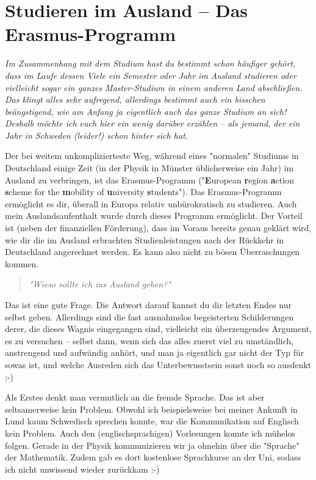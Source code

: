 \section[Studieren im Ausland – Erasmus]{Studieren im Ausland – Das Erasmus-Programm}
\begin{multicols}{2}
\textit{Im Zusammenhang mit dem Studium hast du bestimmt schon häufiger gehört, dass im Laufe dessen Viele ein Semester oder Jahr im Ausland studieren oder vielleicht sogar ein ganzes Master-Studium in einem anderen Land abschließen.
Das klingt alles sehr aufregend, allerdings bestimmt auch ein bisschen beängstigend, wie am Anfang ja eigentlich auch das ganze Studium an sich!
Deshalb möchte ich euch hier ein wenig darüber erzählen – als jemand, der ein Jahr in Schweden (leider!) schon hinter sich hat.}

Der bei weitem unkomplizierteste Weg, während eines "normalen" Studiums in Deutschland einige Zeit (in der Physik in Münster üblicherweise ein Jahr) im Ausland zu verbringen, ist das Erasmus-Programm ("\textbf{E}uropean \textbf{r}egion \textbf{a}ction \textbf{s}cheme for the \textbf{m}obility of \textbf{u}niversity \textbf{s}tudents").
Das Erasmus-Programm ermöglicht es dir, überall in Europa relativ unbürokratisch zu studieren.
Auch mein Auslandsaufenthalt wurde durch dieses Programm ermöglicht.
Der Vorteil ist (neben der finanziellen Förderung), dass im Voraus bereits genau geklärt wird, wie dir die im Ausland erbrachten Studienleistungen nach der Rückkehr in Deutschland angerechnet werden.
Es kann also nicht zu bösen Überraschungen kommen.

\begin{quote}
	\textit{"Wieso sollte ich ins Ausland gehen?"}
\end{quote}
Das ist eine gute Frage.
Die Antwort darauf kannst du dir letzten Endes nur selbst geben.
Allerdings sind die fast ausnahmslos begeisterten Schilderungen derer, die dieses Wagnis eingegangen sind, vielleicht ein überzeugendes Argument, es zu versuchen – selbst dann, wenn sich das alles zuerst viel zu umständlich, anstrengend und aufwändig anhört, und man ja eigentlich gar nicht der Typ für sowas ist, und welche Ausreden sich das Unterbewusstsein sonst noch so ausdenkt ;-)

Als Erstes denkt man vermutlich an die fremde Sprache.
Das ist aber seltsamerweise kein Problem.
Obwohl ich beispielsweise bei meiner Ankunft in Lund kaum Schwedisch sprechen konnte, war die Kommunikation auf Englisch kein Problem.
Auch den (englischsprachigen) Vorlesungen konnte ich mühelos folgen.
Gerade in der Physik kommunizieren wir ja ohnehin über die "Sprache" der Mathematik.
Zudem gab es dort kostenlose Sprachkurse an der Uni, sodass ich nicht unwissend wieder zurückkam :-)


\end{multicols}
